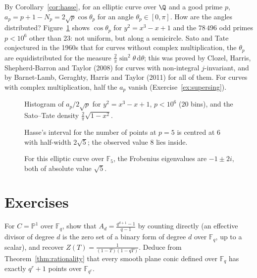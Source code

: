 \begin{remark}
By Corollary~\ref{cor:hasse}, for an elliptic curve over $\Q$ and a good prime $p$, $a_p=p+1-N_p=2\sqrt p\cos\theta_p$ for an angle $\theta_p\in[0,\pi]$. How are
the angles distributed? Figure~\ref{fig:satotate} shows $\cos\theta_p$ for $y^2=x^3-x+1$ and the $78\,496$ odd primes $p<10^6$ other than $23$: not uniform, but along a
semicircle. Sato and Tate conjectured in the 1960s that for curves without complex multiplication, the $\theta_p$ are equidistributed for the measure
$\frac2\pi\sin^2\theta\,\mathrm d\theta$; this was proved by Clozel, Harris, Shepherd-Barron and Taylor (2008) for curves with non-integral $j$-invariant, and by
Barnet-Lamb, Geraghty, Harris and Taylor (2011) for all of them. For curves with complex multiplication, half the $a_p$ vanish (Exercise~\ref{ex:supersing}).
\end{remark}

\begin{figure}[ht]
\centering{}
\caption{Histogram of $a_p/2\sqrt p$ for $y^2=x^3-x+1$, $p<10^6$ ($20$ bins), and the Sato--Tate density $\frac2\pi\sqrt{1-x^2}$.}
\label{fig:satotate}
\end{figure}

\begin{figure}[ht]
\centering
{}
\caption{Hasse's interval for the number of points at $p=5$ is centred at $6$ with half-width $2\sqrt5$; the observed value $8$ lies inside.}
\label{fig:v13-extra-16-a}
\end{figure}

\begin{figure}[ht]
\centering
{}
\caption{For this elliptic curve over $\mathbb F_5$, the Frobenius eigenvalues are $-1\pm2i$, both of absolute value $\sqrt5$.}
\label{fig:v13-extra-16-b}
\end{figure}

\section{Exercises}

\begin{exercise}[$\star$]\label{ex:zetaP1}
For $C=\mathbb P^1$ over $\mathbb F_q$, show that $A_d=\frac{q^{d+1}-1}{q-1}$ by counting directly (an effective divisor of degree $d$ is the zero set of a binary form of
degree $d$ over $\mathbb F_q$, up to a scalar), and recover $Z(T)=\frac1{(1-T)(1-qT)}$. Deduce from Theorem~\ref{thm:rationality} that every smooth plane conic defined
over $\mathbb F_q$ has exactly $q^r+1$ points over $\mathbb F_{q^r}$.
\end{exercise}

